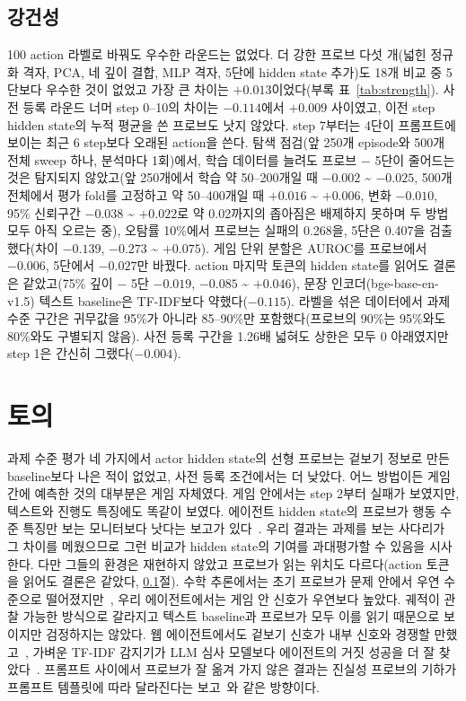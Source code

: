 \documentclass[10pt]{article}
\begin{document}
\subsection{강건성}\label{sec:robust}
100 action 라벨로 바꿔도 우수한 라운드는 없었다. 더 강한 프로브 다섯 개(넓힌 정규화 격자, PCA, 네 깊이 결합, MLP 격자, 5단에 hidden state 추가)도 18개 비교 중 5단보다 우수한 것이 없었고 가장 큰 차이는 $+0.013$이었다(부록 표~\ref{tab:strength}).
사전 등록 라운드 너머 step 0--10의 차이는 $-0.114$에서 $+0.009$ 사이였고, 이전 step hidden state의 누적 평균을 쓴 프로브도 낫지 않았다. step 7부터는 4단이 프롬프트에 보이는 최근 6 step보다 오래된 action을 쓴다.
탐색 점검(앞 250개 episode와 500개 전체 sweep 하나, 분석마다 1회)에서, 학습 데이터를 늘려도 프로브 $-$ 5단이 줄어드는 것은 탐지되지 않았고(앞 250개에서 학습 약 50--200개일 때 $-0.002$ \textasciitilde{} $-0.025$, 500개 전체에서 평가 fold를 고정하고 약 50--400개일 때 $+0.016$ \textasciitilde{} $+0.006$, 변화 $-0.010$, 95\% 신뢰구간 $-0.038$ \textasciitilde{} $+0.022$로 약 0.02까지의 좁아짐은 배제하지 못하며 두 방법 모두 아직 오르는 중), 오탐률 10\%에서 프로브는 실패의 0.268을, 5단은 0.407을 검출했다(차이 $-0.139$, $-0.273$ \textasciitilde{} $+0.075$). 게임 단위 분할은 AUROC를 프로브에서 $-0.006$, 5단에서 $-0.027$만 바꿨다. action 마지막 토큰의 hidden state를 읽어도 결론은 같았고(75\% 깊이 $-$ 5단 $-0.019$, $-0.085$ \textasciitilde{} $+0.046$), 문장 인코더(bge-base-en-v1.5) 텍스트 baseline은 TF-IDF보다 약했다($-0.115$). 라벨을 섞은 데이터에서 과제 수준 구간은 귀무값을 95\%가 아니라 85--90\%만 포함했다(프로브의 90\%는 95\%와도 80\%와도 구별되지 않음). 사전 등록 구간을 1.26배 넓혀도 상한은 모두 0 아래였지만 step 1은 간신히 그랬다($-0.004$).

\section{토의}
과제 수준 평가 네 가지에서 actor hidden state의 선형 프로브는 겉보기 정보로 만든 baseline보다 나은 적이 없었고, 사전 등록 조건에서는 더 낮았다.
어느 방법이든 게임 간에 예측한 것의 대부분은 게임 자체였다. 게임 안에서는 step 2부터 실패가 보였지만, 텍스트와 진행도 특징에도 똑같이 보였다.
에이전트 hidden state의 프로브가 행동 수준 특징만 보는 모니터보다 낫다는 보고가 있다~\cite{ruan2026doomed}. 우리 결과는 과제를 보는 사다리가 그 차이를 메웠으므로 그런 비교가 hidden state의 기여를 과대평가할 수 있음을 시사한다. 다만 그들의 환경은 재현하지 않았고 프로브가 읽는 위치도 다르다(action 토큰을 읽어도 결론은 같았다, \ref{sec:robust}절).
수학 추론에서는 초기 프로브가 문제 안에서 우연 수준으로 떨어졌지만~\cite{bulut2026problem}, 우리 에이전트에서는 게임 안 신호가 우연보다 높았다. 궤적이 관찰 가능한 방식으로 갈라지고 텍스트 baseline과 프로브가 모두 이를 읽기 때문으로 보이지만 검정하지는 않았다.
웹 에이전트에서도 겉보기 신호가 내부 신호와 경쟁할 만했고~\cite{pan2026monitoring}, 가벼운 TF-IDF 감지기가 LLM 심사 모델보다 에이전트의 거짓 성공을 더 잘 찾았다~\cite{advani2026false}. 프롬프트 사이에서 프로브가 잘 옮겨 가지 않은 결과는 진실성 프로브의 기하가 프롬프트 템플릿에 따라 달라진다는 보고~\cite{poulis2026truth}와 같은 방향이다.
\end{document}

